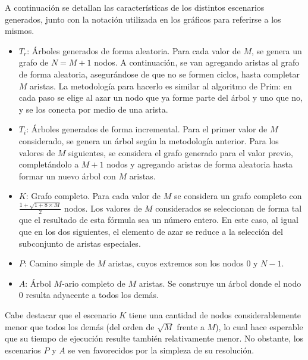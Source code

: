     A continuación se detallan las características de los distintos escenarios
    generados, junto con la notación utilizada en los gráficos para referirse
    a los mismos.
    \begin{itemize}
        \item $T_r$: Árboles generados de forma aleatoria. Para cada valor de
        $M$, se genera un grafo de $N = M+1$ nodos. A continuación, se van
        agregando aristas al grafo de forma aleatoria, asegurándose de que no
        se formen ciclos, hasta completar $M$ aristas. La metodología para
        hacerlo es similar al algoritmo de Prim: en cada paso se elige al azar
        un nodo que ya forme parte del árbol y uno que no, y se los conecta
        por medio de una arista.
        \item $T_i$: Árboles generados de forma incremental. Para el primer
        valor de $M$ considerado, se genera un árbol según la metodología
        anterior. Para los valores de $M$ siguientes, se considera el grafo
        generado para el valor previo, completándolo a $M+1$ nodos y agregando
        aristas de forma aleatoria hasta formar un nuevo árbol con $M$
        aristas.
        \item $K$: Grafo completo. Para cada valor de $M$ se considera un
        grafo completo con $\frac{1 + \sqrt{1 + 8 \times M}}{2}$ nodos. Los
        valores de $M$ considerados se seleccionan de forma tal que el
        resultado de esta fórmula sea un número entero. En este caso, al
        igual que en los dos siguientes, el elemento de azar se
        reduce a la selección del subconjunto de aristas especiales.
        \item $P$: Camino simple de $M$ aristas, cuyos extremos son los nodos
        $0$ y $N-1$.
        \item $A$: Árbol $M$-ario completo de $M$ aristas. Se construye un
        árbol donde el nodo $0$ resulta adyacente a todos los demás.
    \end{itemize}

    Cabe destacar que el escenario $K$ tiene una cantidad de nodos
    considerablemente menor que todos los demás (del orden de $\sqrt{M}$
    frente a $M$), lo cual hace esperable que su tiempo de ejecución resulte
    también relativamente menor. No obstante, los escenarios $P$ y $A$ se ven
    favorecidos por la simpleza de su resolución.

